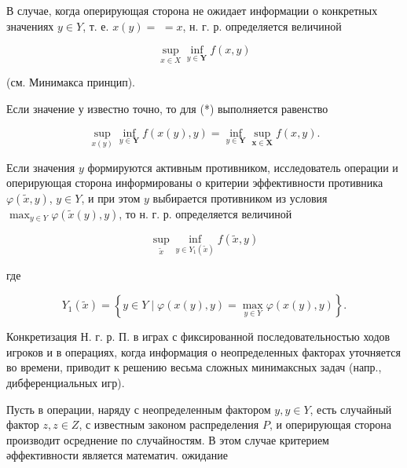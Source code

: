 \documentclass[10pt]{article}
\begin{document}
В случае, когда оперирующая сторона не ожидает информации о конкретных значениях $y \in Y$, т. е. $x(y)=$ $=x$, н. г. р. определяется величиной



\[

\sup _{x \in X} \inf _{y \in \boldsymbol{Y}} f(x, y)

\]



(см. Минимакса принцип).



Если значение $у$ известно точно, то для (*) выполняется равенство



\[

\sup _{x(y)} \inf _{y \in \boldsymbol{Y}} f(x(y), y)=\inf _{y \in \boldsymbol{Y}} \sup _{\boldsymbol{x} \in \boldsymbol{X}} f(x, y) .

\]



Если значения $y$ формируются активным противником, исследователь операции и оперирующая сторона информированы о критерии эффективности противника $\varphi(\tilde{x}, y)$, $y \in Y$, и при этом $y$ выбирается противником из условия $\max _{y \in Y} \varphi(\tilde{x}(y), y)$, то н. г. р. определяется величиной



\[

\sup _{\tilde{x}} \inf _{y \in Y_{1}(\tilde{x})} f(\tilde{x}, y)

\]



где



\[

Y_{1}(\tilde{x})=\left\{y \in Y \mid \varphi(x(y), y)=\max _{y \in Y} \varphi(x(y), y)\right\} .

\]



Конкретизация Н. г. р. П. в играх с фиксированной последовательностью ходов игроков и в операциях, когда информация о неопределенных факторах уточняется во времени, приводит к решению весьма сложных минимаксных задач (напр., дибференциальных игр).



Пусть в операции, наряду с неопределенным фактором $y, y \in Y$, есть случайный фактор $z, z \in Z$, с известным законом распределения $P$, и оперирующая сторона производит осреднение по случайностям. В этом случае критерием әффективности является математич. ожидание
\end{document}
